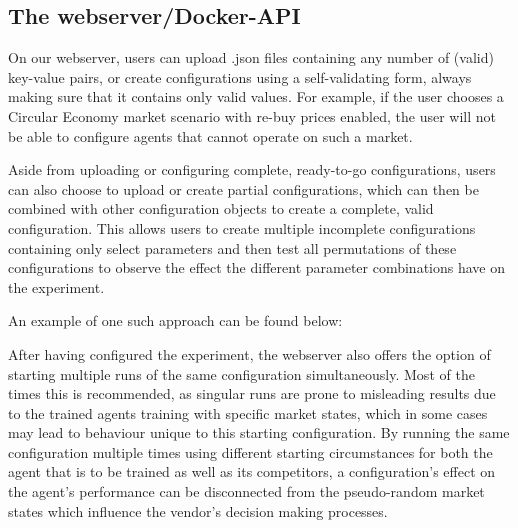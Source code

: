 \subsection{The webserver/Docker-API}

On our webserver, users can upload .json files containing any number of (valid) key-value pairs, or create configurations using a self-validating form, always making sure that it contains only valid values. For example, if the user chooses a Circular Economy market scenario with re-buy prices enabled, the user will not be able to configure agents that cannot operate on such a market.

Aside from uploading or configuring complete, ready-to-go configurations, users can also choose to upload or create partial configurations, which can then be combined with other configuration objects to create a complete, valid configuration. This allows users to create multiple incomplete configurations containing only select parameters and then test all permutations of these configurations to observe the effect the different parameter combinations have on the experiment. 

An example of one such approach can be found below:

After having configured the experiment, the webserver also offers the option of starting multiple runs of the same configuration simultaneously. Most of the times this is recommended, as singular runs are prone to misleading results due to the trained agents training with specific market states, which in some cases may lead to behaviour unique to this starting configuration. By running the same configuration multiple times using different starting circumstances for both the agent that is to be trained as well as its competitors, a configuration's effect on the agent's performance can be disconnected from the pseudo-random market states which influence the vendor's decision making processes.

